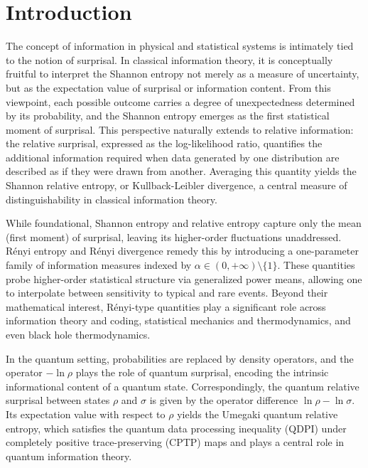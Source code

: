 \documentclass[a4paper, amsfonts, amssymb, amsmath, reprint, showkeys, nofootinbib, twoside, aps, pra]{revtex4-2}
\theoremstyle{definition}
\begin{document}
\section{Introduction} \label{intro}
The concept of information in physical and statistical systems is intimately tied to the notion of surprisal. In classical information
theory, it is conceptually fruitful to interpret the Shannon entropy not merely as a measure of uncertainty, but as the expectation value of surprisal or information content\cite{Shannon1948,ShannonWeaver1964,Wilde2013}. From this viewpoint, each possible outcome carries a degree of unexpectedness determined by its probability, and the Shannon entropy emerges as the first statistical moment of surprisal. This perspective naturally extends to relative information: the relative surprisal, expressed as the log-likelihood ratio, quantifies the additional
information required when data generated by one distribution are described as if they were drawn from another. Averaging this quantity yields the Shannon relative entropy, or Kullback-Leibler divergence\cite{Kullback1951,Cover2006}, a central measure of distinguishability in classical information theory.

While foundational, Shannon entropy and relative entropy capture only the mean (first moment) of surprisal, leaving its higher-order fluctuations unaddressed. Rényi entropy and Rényi divergence\cite{Renyi1961,vanErven2014} remedy this by introducing a one-parameter family of information measures indexed by $\alpha\in(0,+\infty)\setminus\{1\}$. These quantities probe higher-order statistical structure via generalized power means, allowing one to interpolate between sensitivity to typical and rare
events. Beyond their mathematical interest, Rényi-type quantities play a significant role across information theory and coding\cite{Bercher2009,AtarMerhav2015}, statistical mechanics and thermodynamics\cite{Fuentes2022,Baez2022}, and even black hole thermodynamics\cite{Czinner2016,Nakarachinda2025}.

In the quantum setting, probabilities are replaced by density operators, and the operator $-\ln\rho$ plays the role of quantum surprisal, encoding the intrinsic informational content of a quantum state. Correspondingly, the quantum relative surprisal between states $\rho$ and $\sigma$ is given by the operator difference $\ln\rho-\ln\sigma$\cite{Boes2022}. Its expectation value with respect to $\rho$ yields the Umegaki quantum relative entropy\cite{Umegaki1962}, 
which satisfies the quantum data processing inequality  (QDPI) under completely positive trace-preserving (CPTP) maps\cite{Lindblad1975,Hayashi2017} and plays a central role in quantum information theory.
\end{document}
